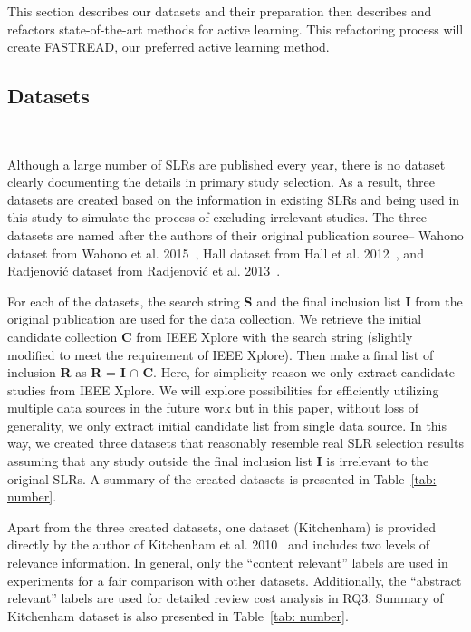 \documentclass{svjour3}
\theoremstyle{break}
\newcommand{\respto}[1]{
\fcolorbox{black}{black!15}{
\label{response:#1}
\bf
  \scriptsize R-{#1}}~
}
\begin{document}
This section describes our datasets and their preparation then describes and refactors state-of-the-art methods for active learning.
This refactoring process will create FASTREAD, our preferred active learning
method. 

\subsection{Datasets}
\label{sect: datasets}

\respto{1c}
Although a large number of SLRs are published every year, there is no dataset clearly documenting the details in primary study selection. As a result, three datasets are created based on the information in existing SLRs and being used in this study to simulate the process of excluding irrelevant studies. The three datasets are named after the authors of their original publication source-- Wahono dataset from Wahono et al. 2015~\cite{wahono2015systematic}, Hall dataset from Hall et al. 2012~\cite{hall2012systematic}, and Radjenovi{\'c} dataset from Radjenovi{\'c} et al. 2013~\cite{radjenovic2013software}. 

For each of the datasets, the search string \textbf{S} and the final inclusion list \textbf{I} from the original publication are used for the data collection. We retrieve the initial candidate collection \textbf{C} from IEEE Xplore with the search string (slightly modified to meet the requirement of IEEE Xplore). Then make a final list of inclusion \textbf{R} as \textbf{R} = \textbf{I} $\cap$ \textbf{C}. Here, for simplicity reason we only extract candidate studies from IEEE Xplore. We will explore possibilities for efficiently utilizing multiple data sources in the future work but in this paper, without loss of generality, we only extract initial candidate list from single data source. In this way, we created three datasets that reasonably resemble real SLR selection results assuming that any study outside the final inclusion list \textbf{I} is irrelevant to the original SLRs. A summary of the created datasets is presented in Table~\ref{tab: number}.

Apart from the three created datasets, one dataset (Kitchenham) is provided directly by the author of Kitchenham et al. 2010~\cite{kitchenham2010systematic} and includes two levels of relevance information. In general, only the ``content relevant'' labels are used in experiments for a fair comparison with other datasets. Additionally, the ``abstract relevant'' labels are used for detailed review cost analysis in RQ3. Summary of Kitchenham dataset is also presented in Table~\ref{tab: number}.
\end{document}
